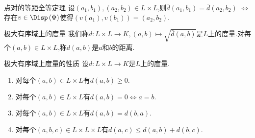 \begin{lemma}{点对的等距全等定理}{}
	设$\left(a_{1},b_{1}\right),\left(a_{2},b_{2}\right)\in L\times L$,则$\bar{d}\left(a_{1},b_{1}\right)=\bar{d}\left(a_{2},b_{2}\right)$ $\iff$存在$v\in\Disp\left(\Phi\right)$使得$\left(v\left(a_{1}\right),v\left(b_{1}\right)\right)=\left(a_{2},b_{2}\right)$.
\end{lemma}

\begin{definition}{极大有序域上的度量}{}
	我们称$d:L\times L\to K,\left(a,b\right)\mapsto\sqrt{\bar{d}\left(a,b\right)}$是$L$上的度量.对每个$\left(a,b\right)\in L\times L$,称$d\left(a,b\right)$是$a$和$b$的距离.
\end{definition}

\begin{proposition}{极大有序域上度量的性质}{}
	设$d:L\times L\to K$是$L$上的度量.
	\begin{enumerate}
		\item 对每个$\left(a,b\right)\in L\times L$有$d\left(a,b\right)\geq 0$.
		\item 对每个$\left(a,b\right)\in L\times L$有$d\left(a,b\right)=0\iff a=b$.
		\item 对每个$\left(a,b\right)\in L\times L$有$d\left(a,b\right)=d\left(b,a\right)$.
		\item 对每个$\left(a,b,c\right)\in L\times L\times L$有$d\left(a,c\right)\leq d\left(a,b\right)+d\left(b,c\right)$.
	\end{enumerate}
\end{proposition}



